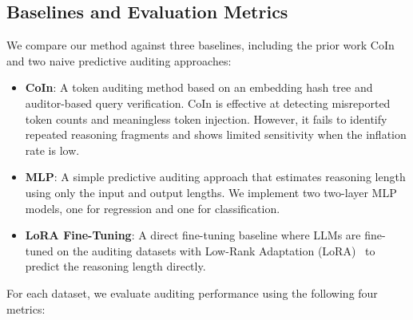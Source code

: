 \documentclass[pdflatex,sn-mathphys-num]{sn-jnl}%
\theoremstyle{thmstyleone}%
\theoremstyle{thmstyletwo}%
\theoremstyle{thmstylethree}%
\begin{document}
\subsection{Baselines and Evaluation Metrics}
We compare our method against three baselines, including the prior work CoIn~\citep{sun2025coin} and two naive predictive auditing approaches:
\begin{itemize}
\item \textbf{CoIn}: A token auditing method based on an embedding hash tree and auditor-based query verification. CoIn is effective at detecting misreported token counts and meaningless token injection. However, it fails to identify repeated reasoning fragments and shows limited sensitivity when the inflation rate is low.
\item \textbf{MLP}: A simple predictive auditing approach that estimates reasoning length using only the input and output lengths. We implement two two-layer MLP models, one for regression and one for classification.
\item \textbf{LoRA Fine-Tuning}: A direct fine-tuning baseline where LLMs are fine-tuned on the auditing datasets with Low-Rank Adaptation (LoRA)~\citep{hu2022lora} to predict the reasoning length directly.
\end{itemize}
For each dataset, we evaluate auditing performance using the following four metrics:
\end{document}
